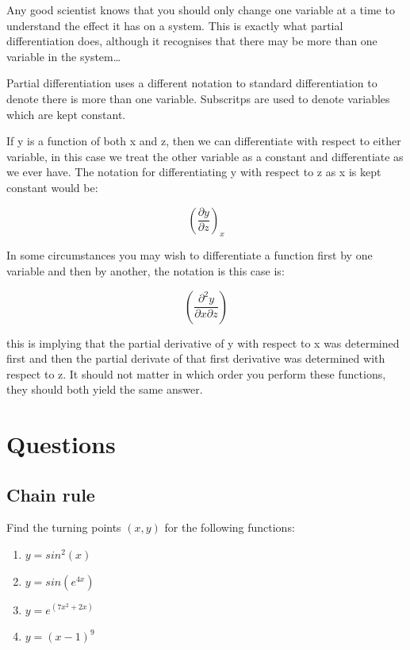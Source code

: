 \documentclass[
]{book}
\providecommand{\tightlist}{%
  \setlength{\itemsep}{0pt}\setlength{\parskip}{0pt}}
\begin{document}
Any good scientist knows that you should only change one variable at a time to understand the effect it has on a system. This is exactly what partial differentiation does, although it recognises that there may be more than one variable in the system\ldots{}

Partial differentiation uses a different notation to standard differentiation to denote there is more than one variable. Subscritps are used to denote variables which are kept constant.

If y is a function of both x and z, then we can differentiate with respect to either variable, in this case we treat the other variable as a constant and differentiate as we ever have. The notation for differentiating y with respect to z as x is kept constant would be:

\begin{equation*}
\left(\frac{\partial y}{\partial z}\right)_x
\end{equation*}

In some circumstances you may wish to differentiate a function first by one variable and then by another, the notation is this case is:

\begin{equation*}
\left(\frac{\partial^2 y}{\partial x \partial z}\right)
\end{equation*}

this is implying that the partial derivative of y with respect to x was determined first and then the partial derivate of that first derivative was determined with respect to z. It should not matter in which order you perform these functions, they should both yield the same answer.

\hypertarget{sec:Questions5}{%
\section{Questions}\label{sec:Questions5}}

\hypertarget{chain-rule}{%
\subsection{Chain rule}\label{chain-rule}}

Find the turning points \((x,y)\) for the following functions:

\begin{enumerate}
\def\labelenumi{\arabic{enumi}.}
\tightlist
\item
  \(y = sin^2(x)\)
\item
  \(y = sin(e^{4x})\)
\item
  \(y = e^{(7x^2 + 2x)}\)
\item
  \(y = (x-1)^9\)
\end{enumerate}
\end{document}
